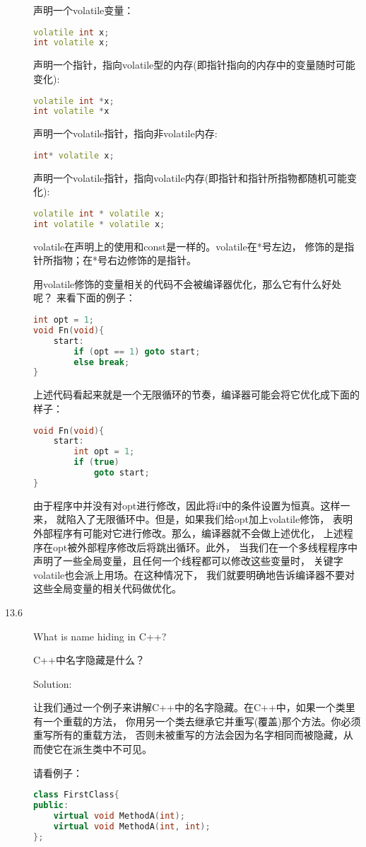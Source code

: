 \begin{description}
声明一个volatile变量：
\begin{lstlisting}[language=C++]
volatile int x;
int volatile x;
\end{lstlisting}
声明一个指针，指向volatile型的内存(即指针指向的内存中的变量随时可能变化):
\begin{lstlisting}[language=C++]
volatile int *x;
int volatile *x
\end{lstlisting}
声明一个volatile指针，指向非volatile内存:
\begin{lstlisting}[language=C++]
int* volatile x;
\end{lstlisting}
声明一个volatile指针，指向volatile内存(即指针和指针所指物都随机可能变化):
\begin{lstlisting}[language=C++]
volatile int * volatile x;
int volatile * volatile x;
\end{lstlisting}
volatile在声明上的使用和const是一样的。volatile在*号左边， 修饰的是指针所指物；在*号右边修饰的是指针。

用volatile修饰的变量相关的代码不会被编译器优化，那么它有什么好处呢？ 来看下面的例子：
\begin{lstlisting}[language=C++]
int opt = 1;
void Fn(void){
    start:
        if (opt == 1) goto start;
        else break;
}
\end{lstlisting}
上述代码看起来就是一个无限循环的节奏，编译器可能会将它优化成下面的样子：
\begin{lstlisting}[language=C++]
void Fn(void){
    start:
        int opt = 1;
        if (true)
            goto start;
}
\end{lstlisting}
由于程序中并没有对opt进行修改，因此将if中的条件设置为恒真。这样一来， 就陷入了无限循环中。但是，如果我们给opt加上volatile修饰， 表明外部程序有可能对它进行修改。那么，编译器就不会做上述优化， 上述程序在opt被外部程序修改后将跳出循环。此外， 当我们在一个多线程程序中声明了一些全局变量，且任何一个线程都可以修改这些变量时， 关键字volatile也会派上用场。在这种情况下， 我们就要明确地告诉编译器不要对这些全局变量的相关代码做优化。


\item[13.6] What is name hiding in C++?

C++中名字隐藏是什么？

Solution: 

让我们通过一个例子来讲解C++中的名字隐藏。在C++中，如果一个类里有一个重载的方法， 你用另一个类去继承它并重写(覆盖)那个方法。你必须重写所有的重载方法， 否则未被重写的方法会因为名字相同而被隐藏，从而使它在派生类中不可见。

请看例子：
\begin{lstlisting}[language=C++]
class FirstClass{
public:
    virtual void MethodA(int);
    virtual void MethodA(int, int);
};


\end{lstlisting}
\end{description}

